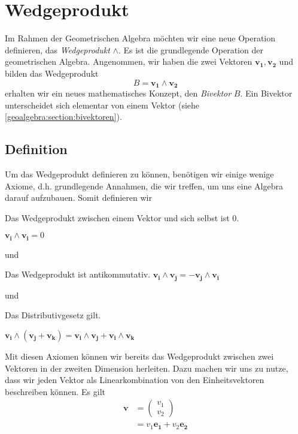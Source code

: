 
\section{Wedgeprodukt
\label{geoalgebra:section:wedgeprodukt}}

Im Rahmen der Geometrischen Algebra möchten wir eine neue Operation
definieren, das \emph{Wedgeprodukt} $\wedge$.
Es ist die grundlegende Operation der geometrischen
Algebra.
Angenommen, wir haben die
zwei Vektoren $\mathbf{v_1}, \mathbf{v_2}$ und bilden das Wedgeprodukt
\begin{equation}
  B = \mathbf{v_1} \wedge \mathbf{v_2}
\end{equation}
erhalten wir ein neues mathematisches Konzept, den \emph{Bivektor} $B$.
Ein Bivektor unterscheidet sich elementar von einem Vektor (siehe \ref{geoalgebra:section:bivektoren}).

\subsection{Definition}
Um das Wedgeprodukt definieren zu können, benötigen wir einige wenige Axiome, d.h. grundlegende Annahmen, die wir treffen,
um uns eine Algebra darauf aufzubauen. Somit definieren wir

\begin{satz}
  Das Wedgeprodukt zwischen einem Vektor und sich selbst ist 0.

  $
  \mathbf{v_i} \wedge \mathbf{v_i} = 0
  $
\end{satz}
und
\begin{satz}
Das Wedgeprodukt ist antikommutativ.
  $
  \mathbf{v_i} \wedge \mathbf{v_j} = -\mathbf{v_j} \wedge \mathbf{v_i}
  $
  \label{geoalgebra:satz:antikommutativ}
\end{satz}
und
\begin{satz}
Das Distributivgesetz gilt.

  $
  \mathbf{v_i} \wedge (\mathbf{v_j} + \mathbf{v_k}) = \mathbf{v_i} \wedge \mathbf{v_j} + \mathbf{v_i} \wedge \mathbf{v_k}
  $
\end{satz}

Mit diesen Axiomen können wir bereits das Wedgeprodukt zwischen zwei
Vektoren in der zweiten Dimension herleiten.
Dazu machen wir uns zu nutze, dass wir jeden Vektor als
Linearkombination von den Einheitsvektoren beschreiben können.
Es gilt
\begin{align}
  \mathbf{v} &= \begin{pmatrix} v_1 \\ v_2 \end{pmatrix} \\
    &= v_1 \mathbf{e_1} + v_2 \mathbf{e_2}
\end{align}

